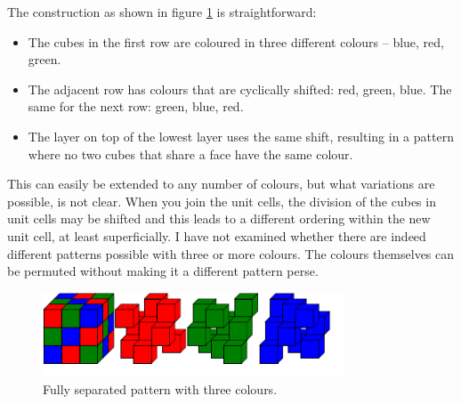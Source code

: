 \documentclass[onecolumn]{article}
\begin{document}
The construction as shown in figure \ref{separated_colours} is straightforward:
\begin{itemize}
\item
The cubes in the first row are coloured in three different colours -- blue, red, green.
\item
The adjacent row has colours that are cyclically shifted: red, green, blue. The same for the next row: green, blue, red.
\item
The layer on top of the lowest layer uses the same shift, resulting in a pattern where no two cubes that share a face have
the same colour.
\end{itemize}
%
This can easily be extended to any number of colours, but what variations are possible, is not clear. When you join the
unit cells, the division of the cubes in unit cells may be shifted and this leads to a different ordering within the
new unit cell, at least superficially. I have not examined whether there are indeed different patterns possible with
three or more colours. The colours themselves can be permuted without making it a different pattern perse.

\begin{figure}
\center
\caption{Fully separated pattern with three colours.}
\label{separated_colours}
\includegraphics[width=0.8\textwidth]{three_separated_colours.pdf}
\end{figure}
\end{document}
